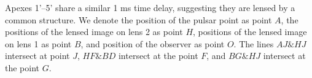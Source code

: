 \documentclass[useAMS,usenatbib]{mn2e}
\begin{document}
Apexes 1'--5' share a similar 1 ms time delay, suggesting they are lensed by
a common structure.
We denote the position of the pulsar point as point $A$, the positions of the lensed image on lens 2 as point $H$, positions of the lensed image on lens 1 as point $B$, and position of the observer as point $O$.  
The lines $AJ\&HJ$ intersect at point $J$, $HF\&BD$ intersect at the point $F$, and $BG\&HJ$ intersect at the point $G$.

\end{document}
